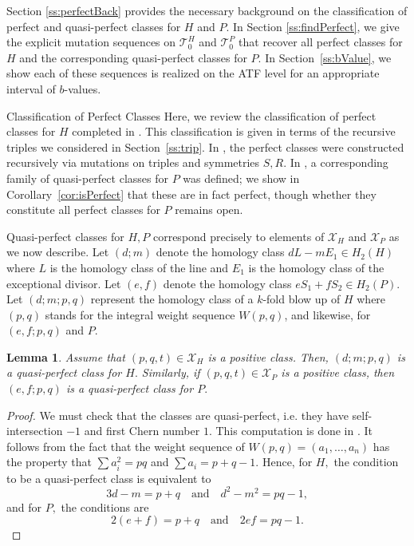 \documentclass[11pt, reqno]{amsart}
\makeatletter
\def\subsection{\@startsection{subsection}{2}%
  \z@{.5\linespacing\@plus.7\linespacing}{-.5em}%
  {\normalfont\large\bfseries}}
\newtheorem{lemma}[thm]{Lemma}
\theoremstyle{remark}
\numberwithin{equation}{subsection}
\numberwithin{figure}{section}
\theoremstyle{customremark}
\newcommand{\Tt}{\mathcal{T}}
\newcommand{\X}{\mathcal{X}}
\makeatother
\begin{document}
Section \ref{ss:perfectBack} provides the necessary background on the classification of perfect and quasi-perfect classes for $H$ and $P$. In Section \ref{ss:findPerfect}, we give the explicit mutation sequences on $\Tt_0^H$ and $\Tt_0^P$ that recover all perfect classes for $H$ and the corresponding quasi-perfect classes for $P.$ In Section~\ref{ss:bValue}, we show each of these sequences is realized on the ATF level for an appropriate interval of $b$-values.



\subsection{Classification of Perfect Classes} \label{ss:perfectBack}
Here, we review the classification of perfect classes for $H$ completed in \cite{MMW}. This classification is given in terms of the recursive triples we considered in Section~\ref{ss:trip}. In \cite{MMW}, the perfect classes were constructed recursively via mutations on triples and symmetries $S,R.$ In \cite{MPW}, a corresponding family of quasi-perfect classes for $P$ was defined; we show in Corollary~\ref{cor:isPerfect} that these are in fact perfect, though whether they constitute all perfect classes for $P$ remains open.


Quasi-perfect classes for $H,P$ correspond precisely to elements of $\X_H$ and $\X_P$ as we now describe.  Let $(d;m)$ denote the homology class $dL-mE_1 \in H_2(H)$ where $L$ is the homology class of the line and $E_1$ is the homology class of the exceptional divisor. Let $(e,f)$ denote the homology class $eS_1+fS_2 \in H_2(P)$. Let $(d;m;p,q)$ represent the homology class of a $k$-fold blow up of $H$ where $(p,q)$ stands for the integral weight sequence $W(p,q)$, and likewise, for  $(e,f;p,q)$ and $P.$ 

\begin{lemma} \label{lem:AreClasses}
    Assume that $(p,q,t) \in \X_H$ is a positive class. Then, $(d;m;p,q)$ is a quasi-perfect class for $H.$ Similarly, if $(p,q,t) \in \X_P$ is a positive class, then $(e,f;p,q)$ is a quasi-perfect class for $P.$ 
\end{lemma}
\begin{proof}
    We must check that the classes are quasi-perfect, i.e. they have self-intersection $-1$ and first Chern number $1$. This computation is done in \cite[Section 2.2]{MM}. It follows from the fact that the weight sequence of $W(p,q)=(a_1,\hdots,a_n)$ has the property that $\sum a_i^2=p q$ and $\sum a_i=p+q-1.$ Hence, for $H,$ the condition to be a quasi-perfect class is equivalent to 
    \[ 3d-m=p+q \quad \text{and} \quad d^2-m^2=pq-1,\]
    and for $P,$ the conditions are
    \[ 2(e+f)=p+q \quad \text{and} \quad 2ef=pq-1.\]
\end{proof}
\end{document}
